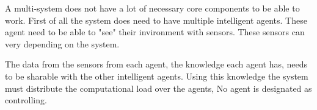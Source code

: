 
A multi-system does not have a lot of necessary core components to be able to work.
First of all the system does need to have multiple intelligent agents. These agent need to be able to 
"see" their invironment with sensors. These sensors can very depending on the system.

The data from the sensors from each agent, the knowledge each agent has,
needs to be sharable with the other intelligent agents. Using this knowledge the system must distribute 
the computational load over the agents, No agent is designated as controlling.
